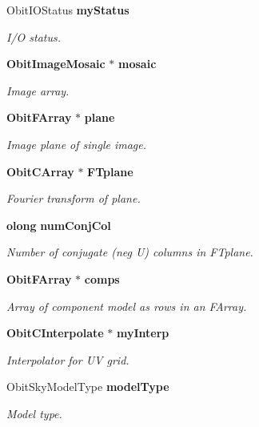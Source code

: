 \begin{CompactItemize}
Obit\-IOStatus {\bf my\-Status}
\begin{CompactList}\small\item\em I/O status. \item\end{CompactList}\item 
{\bf Obit\-Image\-Mosaic} $\ast$ {\bf mosaic}
\begin{CompactList}\small\item\em Image array. \item\end{CompactList}\item 
{\bf Obit\-FArray} $\ast$ {\bf plane}
\begin{CompactList}\small\item\em Image plane of single image. \item\end{CompactList}\item 
{\bf Obit\-CArray} $\ast$ {\bf FTplane}
\begin{CompactList}\small\item\em Fourier transform of plane. \item\end{CompactList}\item 
{\bf olong} {\bf num\-Conj\-Col}
\begin{CompactList}\small\item\em Number of conjugate (neg U) columns in FTplane. \item\end{CompactList}\item 
{\bf Obit\-FArray} $\ast$ {\bf comps}
\begin{CompactList}\small\item\em Array of component model as rows in an FArray. \item\end{CompactList}\item 
{\bf Obit\-CInterpolate} $\ast$ {\bf my\-Interp}
\begin{CompactList}\small\item\em Interpolator for UV grid. \item\end{CompactList}\item 
Obit\-Sky\-Model\-Type {\bf model\-Type}
\begin{CompactList}\small\item\em Model type. \item\end{CompactList}\item 

\end{CompactItemize}

